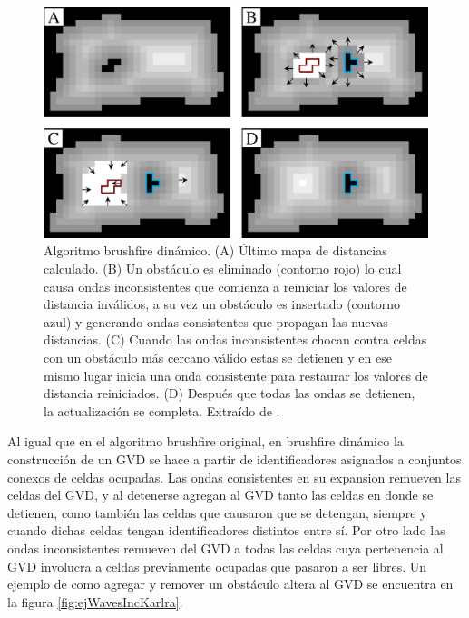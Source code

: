 \begin{figure}[H]
  \center
  \includegraphics[width=1\linewidth]{imagenes/wavesBrushDinClean2Rows.png}
  \caption[Algoritmo brushfire dinámico.]{Algoritmo brushfire dinámico. (A) Último mapa de distancias calculado. (B) Un obstáculo es eliminado (contorno rojo) lo cual causa ondas inconsistentes que comienza a reiniciar los valores de distancia inválidos, a su vez un obstáculo es insertado (contorno azul) y generando ondas consistentes que propagan las nuevas distancias. (C) Cuando las ondas inconsistentes chocan contra celdas con un obstáculo más cercano válido estas se detienen y en ese mismo lugar inicia una onda consistente para restaurar los valores de distancia reiniciados. (D) Después que todas las ondas se detienen, la actualización se completa. Extraído de \cite{Lau2013}.}\label{fig:wavesBrushDyn}
\end{figure} 

Al igual que en el algoritmo brushfire original, en brushfire dinámico la
construcción de un GVD se hace a partir de identificadores asignados a
conjuntos conexos de celdas ocupadas.
Las ondas consistentes en su expansion remueven las celdas del GVD, y al
detenerse agregan al GVD tanto las celdas en donde se detienen, como también
las celdas que causaron que se detengan, siempre y cuando dichas celdas tengan
identificadores distintos entre sí. Por otro lado las ondas inconsistentes remueven del
GVD a todas las celdas cuya pertenencia al GVD involucra a celdas previamente
ocupadas que pasaron a ser libres. Un ejemplo de como agregar y remover un
obstáculo altera al GVD se encuentra en la figura \ref{fig:ejWavesIncKarlra}. 

